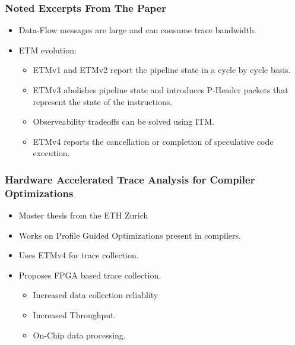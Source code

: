 \documentclass{beamer}
\begin{document}
\begin{frame}
    \frametitle{Noted Excerpts From The Paper}
    \begin{itemize}
        \item Data-Flow messages are large and can consume trace bandwidth.
        \item ETM evolution:
            \begin{itemize}
                \item ETMv1 and ETMv2 report the pipeline state in a cycle by
                    cycle basis.
                \item ETMv3 abolishes pipeline state and introduces P-Header
                    packets that represent the state of the instructions.
                \item Observeability tradeoffs can be solved using ITM.
                \item ETMv4 reports the cancellation or completion of
                    speculative code execution.
            \end{itemize}
    \end{itemize}
\end{frame}
\begin{frame}
    \frametitle{Hardware Accelerated Trace Analysis for Compiler Optimizations}
    \begin{itemize}
        \item Master thesis from the ETH Zurich
        \item Works on Profile Guided Optimizations present in compilers.
        \item Uses ETMv4 for trace collection.
        \item Proposes FPGA based trace collection.
            \begin{itemize}
                \item Increased data collection reliablity
                \item Increased Throughput.
                \item On-Chip data processing.
            \end{itemize}
    \end{itemize}
\end{frame}
\end{document}
